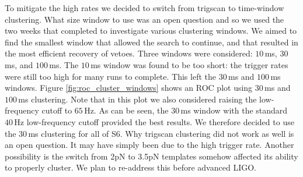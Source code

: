 To mitigate the high rates we decided to switch from trigscan to time-window clustering. What size window to use was an open question and so we used the two weeks that completed to investigate various clustering windows. We aimed to find the smallest window that allowed the search to continue, and that resulted in the most efficient recovery of vetoes. Three windows were considered: $10\,$ms, $30\,$ms, and $100\,$ms. The $10\,$ms window was found to be too short: the trigger rates were still too high for many runs to complete. This left the $30\,$ms and $100\,$ms windows. Figure \ref{fig:roc_cluster_windows} shows an ROC plot using $30\,$ms and $100\,$ms clustering. Note that in this plot we also considered raising the low-frequency cutoff to $65\,$Hz. As can be seen, the $30\,$ms window with the standard $40\,$Hz low-frequency cutoff provided the best results. We therefore decided to use the $30\,$ms clustering for all of \ac{S6}. Why trigscan clustering did not work as well is an open question. It may have simply been due to the high trigger rate. Another possibility is the switch from 2\ac{pN} to 3.5\ac{pN} templates somehow affected its ability to properly cluster. We plan to re-address this before advanced \ac{LIGO}.

